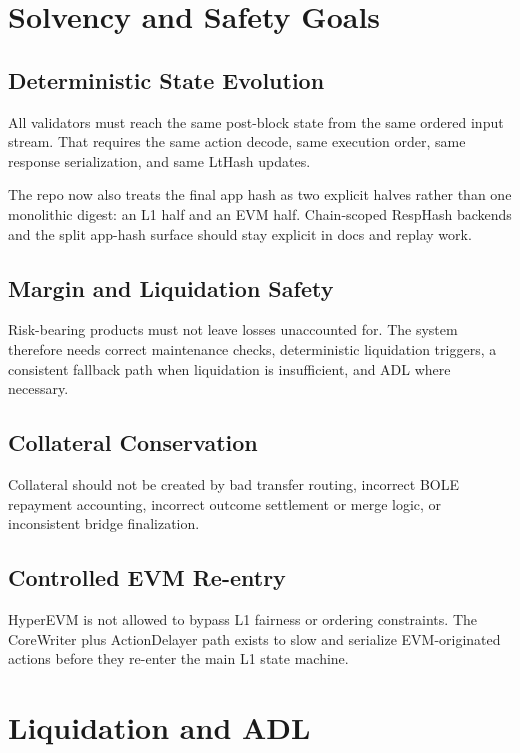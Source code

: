 \documentclass[11pt]{article}
\begin{document}
\section{Solvency and Safety Goals}

\subsection{Deterministic State Evolution}

All validators must reach the same post-block state from the same ordered input
stream. That requires the same action decode, same execution order, same
response serialization, and same LtHash updates.

The repo now also treats the final app hash as two explicit halves rather than
one monolithic digest: an L1 half and an EVM half. Chain-scoped RespHash
backends and the split app-hash surface should stay explicit in docs and replay
work.

\subsection{Margin and Liquidation Safety}

Risk-bearing products must not leave losses unaccounted for. The system
therefore needs correct maintenance checks, deterministic liquidation triggers,
a consistent fallback path when liquidation is insufficient, and ADL where
necessary.

\subsection{Collateral Conservation}

Collateral should not be created by bad transfer routing, incorrect BOLE
repayment accounting, incorrect outcome settlement or merge logic, or
inconsistent bridge finalization.

\subsection{Controlled EVM Re-entry}

HyperEVM is not allowed to bypass L1 fairness or ordering constraints. The
CoreWriter plus ActionDelayer path exists to slow and serialize EVM-originated
actions before they re-enter the main L1 state machine.

\section{Liquidation and ADL}
\end{document}
